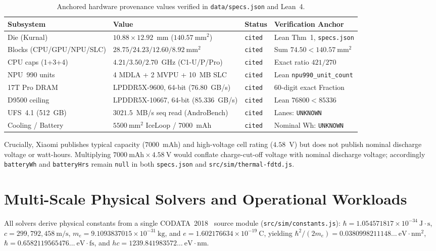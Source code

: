 \documentclass[11pt,a4paper]{amsart}
\newcommand{\code}[1]{{\small\nolinkurl{#1}}}
\theoremstyle{remark}
\begin{document}
\begin{table}[htbp]
\centering
\caption{Anchored hardware provenance values verified in \code{data/specs.json} and Lean~4.}
\label{tab:hardware}
\scriptsize
\begin{tabular}{@{}llll@{}}
\toprule
Subsystem & Value & Status & Verification Anchor \\
\midrule
Die (Kurnal) & $10.88 \times 12.92$~mm ($140.57~\text{mm}^2$) & \code{cited} & Lean Thm~1, \code{specs.json} \\
Blocks (CPU/GPU/NPU/SLC) & $28.75 / 24.23 / 12.60 / 8.92~\text{mm}^2$ & \code{cited} & Sum $74.50 < 140.57~\text{mm}^2$ \\
CPU caps (1+3+4) & $4.21 / 3.50 / 2.70$~GHz (C1-U/P/Pro) & \code{cited} & Exact ratio $421/270$ \\
NPU~990 units & 4 MDLA + 2 MVPU + 10~MB SLC & \code{cited} & Lean \code{npu990_unit_count} \\
17T Pro DRAM & LPDDR5X-9600, 64-bit ($76.80$~GB/s) & \code{cited} & 60-digit exact Fraction \\
D9500 ceiling & LPDDR5X-10667, 64-bit ($85.336$~GB/s) & \code{cited} & Lean $76800 < 85336$ \\
UFS~4.1 (512~GB) & $3021.5$~MB/s seq read (AndroBench) & \code{cited} & Lanes: \code{UNKNOWN} \\
Cooling / Battery & $5500~\text{mm}^2$ IceLoop / $7000$~mAh & \code{cited} & Nominal Wh: \code{UNKNOWN} \\
\bottomrule
\end{tabular}
\end{table}

Crucially, Xiaomi publishes typical capacity ($7000$~mAh) and high-voltage cell
rating ($4.58$~V) but does not publish nominal discharge voltage or watt-hours.
Multiplying $7000~\text{mAh}\times 4.58~\text{V}$ would conflate charge-cut-off
voltage with nominal discharge voltage; accordingly \code{batteryWh} and
\code{batteryHrs} remain \code{null} in both \code{specs.json} and
\code{src/sim/thermal-fdtd.js}.

\section{Multi-Scale Physical Solvers and Operational Workloads}

All solvers derive physical constants from a single CODATA~2018~\cite{tiesinga2021codata}
source module (\code{src/sim/constants.js}):
$\hbar = 1.054571817\times 10^{-34}~\text{J}\cdot\text{s}$,
$c = 299{,}792{,}458~\text{m/s}$,
$m_e = 9.1093837015\times 10^{-31}~\text{kg}$, and
$e = 1.602176634\times 10^{-19}~\text{C}$,
yielding $\hbar^2/(2 m_e) = 0.0380998211148\ldots~\text{eV}\cdot\text{nm}^2$,
$\hbar = 0.6582119565476\ldots~\text{eV}\cdot\text{fs}$, and
$hc = 1239.841983572\ldots~\text{eV}\cdot\text{nm}$.
\end{document}
